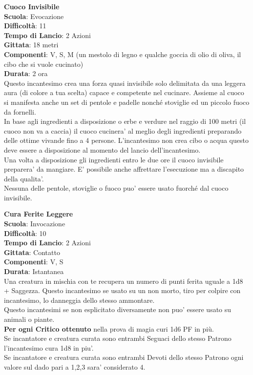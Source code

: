 \begin{multicols}{2}
\medskip\textbf{Cuoco Invisibile}\\
\textbf{Scuola}: Evocazione\\
\textbf{Difficoltà}: 11\\
\textbf{Tempo di Lancio}: 2 Azioni\\
\textbf{Gittata}: 18 metri\\
\textbf{Componenti}: V, S, M (un mestolo di legno e qualche goccia di olio di oliva, il cibo che si vuole cucinato)\\
\textbf{Durata}: 2 ora\\
Questo incantesimo crea una forza quasi invisibile solo delimitata da una leggera aura (di colore a tua scelta) capace e competente nel cucinare. Assieme al cuoco si manifesta anche un set di pentole e padelle nonché stoviglie ed un piccolo fuoco da fornelli.\\
In base agli ingredienti a disposizione o erbe e verdure nel raggio di 100 metri (il cuoco non va a caccia) il cuoco cucinera' al meglio degli ingredienti preparando delle ottime vivande fino a 4 persone. L'incantesimo non crea cibo o acqua questo deve essere a disposizione al momento del lancio dell'incantesimo. \\
Una volta a disposizione gli ingredienti entro le due ore il cuoco invisibile preparera' da mangiare. E' possibile anche affrettare l'esecuzione ma a discapito della qualita'.\\
Nessuna delle pentole, stoviglie o fuoco puo' essere usato fuorché dal cuoco invisibile.

\medskip\textbf{Cura Ferite Leggere}\\
\textbf{Scuola}: Invocazione\\
\textbf{Difficoltà}: 10\\
\textbf{Tempo di Lancio}: 2 Azioni\\
\textbf{Gittata}: Contatto\\
\textbf{Componenti}: V, S\\
\textbf{Durata}: Istantanea\\
Una creatura in mischia con te recupera un numero di punti ferita uguale a 1d8 + Saggezza. Questo incantesimo se usato su un non morto, tiro per colpire con incantesimo, lo danneggia dello stesso ammontare.\\
Questo incantesimi se non esplicitato diversamente non puo' essere usato su animali o piante.\\
\textbf{Per ogni Critico ottenuto} nella prova di magia curi 1d6 PF in più.\\
Se incantatore e creatura curata sono entrambi Seguaci dello stesso Patrono l'incantesimo cura 1d8 in piu'.\\
Se incantatore e creatura curata sono entrambi Devoti dello stesso Patrono ogni valore sul dado pari a 1,2,3 sara' considerato 4.\\


\end{multicols}
